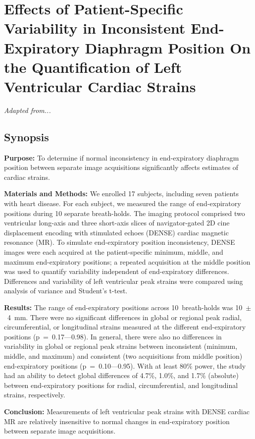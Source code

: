 \chapter{Effects of Patient-Specific Variability in Inconsistent End-Expiratory Diaphragm Position On the Quantification of Left Ventricular Cardiac Strains}

\textit{Adapted from...}

\section{Synopsis}
	\noindent \textbf{Purpose:}  To determine if normal inconsistency in end-expiratory diaphragm position between separate image acquisitions significantly affects estimates of cardiac strains.

	\noindent \textbf{Materials and Methods:} We enrolled 17 subjects, including seven patients with heart disease. For each subject, we measured the range of end-expiratory positions during 10 separate breath-holds. The imaging protocol comprised two ventricular long-axis and three short-axis slices of navigator-gated 2D cine displacement encoding with stimulated echoes (DENSE) cardiac magnetic resonance (MR). To simulate end-expiratory position inconsistency, DENSE images were each acquired at the patient-specific minimum, middle, and maximum end-expiratory positions; a repeated acquisition at the middle position was used to quantify variability independent of end-expiratory differences. Differences and variability of left ventricular peak strains were compared using analysis of variance and Student’s t-test.
	
	\noindent \textbf{Results:} The range of end-expiratory positions across 10~breath-holds was 10~$\pm$~4~mm. There were no significant differences in global or regional peak radial, circumferential, or longitudinal strains measured at the different end-expiratory positions (p~=~0.17–--0.98). In general, there were also no differences in variability in global or regional peak strains between inconsistent (minimum, middle, and maximum) and consistent (two acquisitions from middle position) end-expiratory positions (p~=~0.10--–0.95). With at least 80\% power, the study had an ability to detect global differences of 4.7\%, 1.0\%, and 1.7\% (absolute) between end-expiratory positions for radial, circumferential, and longitudinal strains, respectively.
	
	\noindent \textbf{Conclusion:} Measurements of left ventricular peak strains with DENSE cardiac MR are relatively insensitive to normal changes in end-expiratory position between separate image acquisitions.
	
